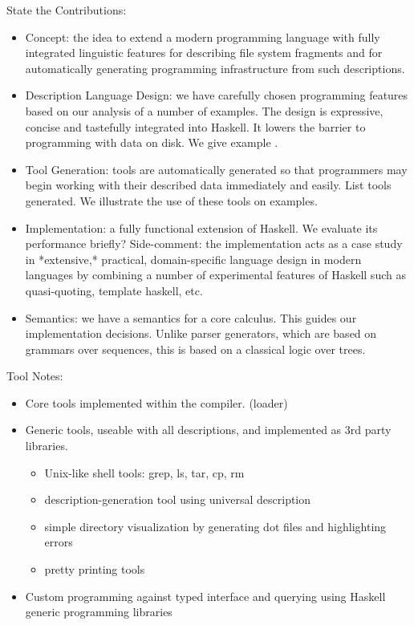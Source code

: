 \documentclass[natbib]{sigplanconf}
\begin{document}
State the Contributions:

\begin{itemize}
\item Concept:  the idea to extend a modern programming language with
fully integrated linguistic features for describing file system fragments
and for automatically generating programming infrastructure from such 
descriptions.

\item Description Language Design:  we have carefully chosen \forest{} programming
features based on our analysis of a number of examples.  The design
is expressive, concise and tastefully integrated into Haskell.
It lowers the barrier to programming with data on disk.  We give example
.

\item Tool Generation:  tools are automatically generated so that programmers
may begin working with their described data immediately and easily.  List
tools generated.  We illustrate the use of these tools on examples.

\item Implementation: a fully functional extension of Haskell.  
We evaluate its performance briefly?  Side-comment: the implementation
acts as a case study in *extensive,* practical,
domain-specific language design in modern languages by
combining a number of experimental features of Haskell such
as quasi-quoting, template haskell, etc.

\item Semantics: we have a semantics for a core calculus.  This
guides our implementation decisions.  Unlike parser generators,
which are based on grammars over sequences, this is based
on a classical logic over trees.
\end{itemize}

Tool Notes:

\begin{itemize}
\item Core tools implemented within the compiler. (loader)
\item Generic tools, useable with all descriptions, and implemented as 3rd party libraries.
\begin{itemize}
\item Unix-like shell tools:  grep, ls, tar, cp, rm
\item description-generation tool using universal description
\item simple directory visualization by generating dot files and highlighting errors
\item pretty printing tools
\end{itemize}
\item Custom programming against typed interface and querying using Haskell generic programming libraries
\end{itemize}
\end{document}
